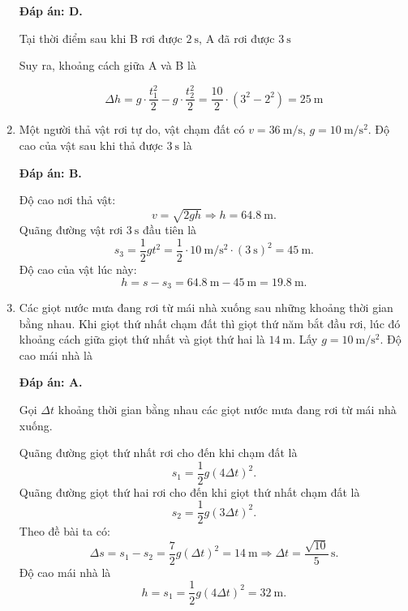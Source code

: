 \begin{enumerate}[label=\bfseries Câu \arabic*:]
{	}
	\loigiai
	{\textbf{Đáp án: D.}
		
		Tại thời điểm sau khi B rơi được $2\ \text{s}$, A đã rơi được $3\ \text{s}$
		
		Suy ra, khoảng cách giữa A và B là
		
		$$\Delta h=g\cdot\dfrac{t_1^2}{2}-g\cdot\dfrac{t_2^2}{2}=\dfrac{10}{2}\cdot \left( 3^2-2^2\right)=25\ \text{m}$$
		
		
		
	}
	\item {}
	
	\cauhoi
	{Một người thả vật rơi tự do, vật chạm đất có $v=\SI{36}{\meter/\second}$, $g=\SI{10}{\meter/\second^2}$. Độ cao của vật sau khi thả được $\SI{3}{\second}$ là
	}
	\loigiai
	{\textbf{Đáp án: B.}
		
		Độ cao nơi thả vật:
		$$v=\sqrt{2gh}\Rightarrow h = \SI{64.8}{\meter}.$$
		Quãng đường vật rơi $\SI{3}{\second}$ đầu tiên là
		$$s_3=\dfrac{1}{2}gt^2=\dfrac{1}{2}\cdot\SI{10}{\meter/\second^2}\cdot(\SI{3}{\second})^2=\SI{45}{\meter}.$$
		Độ cao của vật lúc này:
		$$h=s-s_3=\SI{64.8}{\meter}-\SI{45}{\meter}=\SI{19.8}{\meter}.$$
		
		
	}
	\item {}
	
	\cauhoi
	{Các giọt nước mưa đang rơi từ mái nhà xuống sau những khoảng thời gian bằng nhau. Khi giọt thứ nhất chạm đất thì giọt thứ năm bắt đầu rơi, lúc đó khoảng cách giữa giọt thứ nhất và giọt thứ hai là $\SI{14}{\meter}$. Lấy $g=\SI{10}{\meter/\second^2}$. Độ cao mái nhà là
	}
	\loigiai
	{\textbf{Đáp án: A.}
		
		Gọi $\Delta t$ khoảng thời gian bằng nhau các giọt nước mưa đang rơi từ mái nhà xuống.
		
		Quãng đường giọt thứ nhất rơi cho đến khi chạm đất là
		$$s_1=\dfrac{1}{2}g(4\Delta t)^2.$$
		Quãng đường giọt thứ hai rơi cho đến khi giọt thứ nhất chạm đất là
		$$s_2=\dfrac{1}{2}g(3\Delta t)^2.$$
		Theo đề bài ta có:
		$$\Delta s= s_1-s_2=\dfrac{7}{2}g(\Delta t)^2=\SI{14}{\meter}\Rightarrow \Delta t=\dfrac{\sqrt{10}}{5}\,\text{s}.$$
		Độ cao mái nhà là
		$$h=s_1=\dfrac{1}{2}g(4\Delta t)^2=\SI{32}{\meter}.$$
		
}
\end{enumerate}
